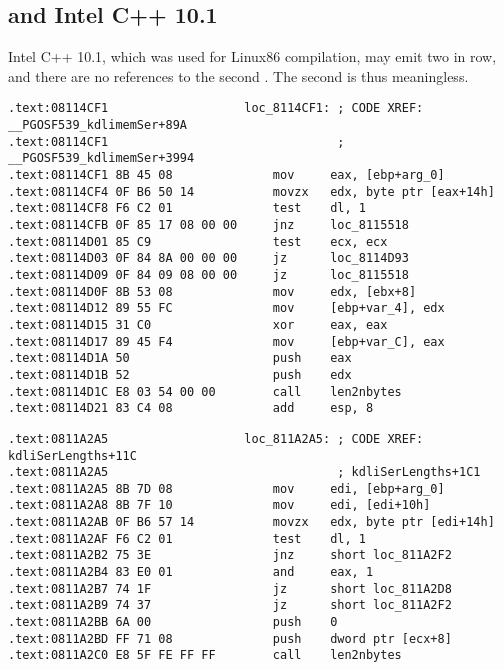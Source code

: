 \label{anomaly:Intel}
\myindex{\CompilerAnomaly}

\subsection{ and Intel C++ 10.1}

\myindex{\oracle}

Intel C++ 10.1, which was used for  Linux86 compilation, may emit two \JZ in row,
and there are no references to the second \JZ. The second \JZ is thus meaningless.

\begin{lstlisting}[caption=kdli.o from libserver11.a,style=customasmx86]
.text:08114CF1                   loc_8114CF1: ; CODE XREF: __PGOSF539_kdlimemSer+89A
.text:08114CF1                                ; __PGOSF539_kdlimemSer+3994
.text:08114CF1 8B 45 08              mov     eax, [ebp+arg_0]
.text:08114CF4 0F B6 50 14           movzx   edx, byte ptr [eax+14h]
.text:08114CF8 F6 C2 01              test    dl, 1
.text:08114CFB 0F 85 17 08 00 00     jnz     loc_8115518
.text:08114D01 85 C9                 test    ecx, ecx
.text:08114D03 0F 84 8A 00 00 00     jz      loc_8114D93
.text:08114D09 0F 84 09 08 00 00     jz      loc_8115518
.text:08114D0F 8B 53 08              mov     edx, [ebx+8]
.text:08114D12 89 55 FC              mov     [ebp+var_4], edx
.text:08114D15 31 C0                 xor     eax, eax
.text:08114D17 89 45 F4              mov     [ebp+var_C], eax
.text:08114D1A 50                    push    eax
.text:08114D1B 52                    push    edx
.text:08114D1C E8 03 54 00 00        call    len2nbytes
.text:08114D21 83 C4 08              add     esp, 8
\end{lstlisting}

\begin{lstlisting}[caption=from the same code,style=customasmx86]
.text:0811A2A5                   loc_811A2A5: ; CODE XREF: kdliSerLengths+11C
.text:0811A2A5                                ; kdliSerLengths+1C1
.text:0811A2A5 8B 7D 08              mov     edi, [ebp+arg_0]
.text:0811A2A8 8B 7F 10              mov     edi, [edi+10h]
.text:0811A2AB 0F B6 57 14           movzx   edx, byte ptr [edi+14h]
.text:0811A2AF F6 C2 01              test    dl, 1
.text:0811A2B2 75 3E                 jnz     short loc_811A2F2
.text:0811A2B4 83 E0 01              and     eax, 1
.text:0811A2B7 74 1F                 jz      short loc_811A2D8
.text:0811A2B9 74 37                 jz      short loc_811A2F2
.text:0811A2BB 6A 00                 push    0
.text:0811A2BD FF 71 08              push    dword ptr [ecx+8]
.text:0811A2C0 E8 5F FE FF FF        call    len2nbytes
\end{lstlisting}

